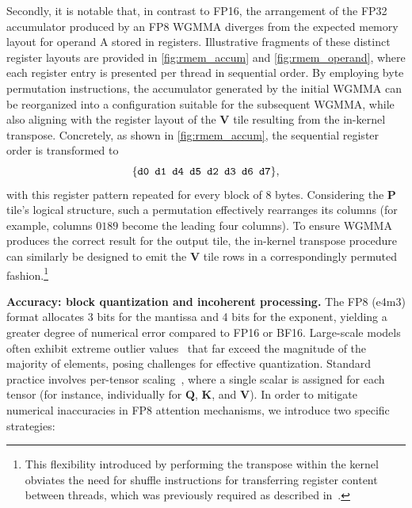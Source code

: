 Secondly, it is notable that, in contrast to FP16, the arrangement of the FP32 accumulator produced by an FP8 WGMMA diverges from the expected memory layout for operand A stored in registers. Illustrative fragments of these distinct register layouts are provided in \cref{fig:rmem_accum} and \cref{fig:rmem_operand}, where each register entry is presented per thread in sequential order. By employing byte permutation instructions, the accumulator generated by the initial WGMMA can be reorganized into a configuration suitable for the subsequent WGMMA, while also aligning with the register layout of the $\mathbf{V}$ tile resulting from the in-kernel transpose. Concretely, as shown in \cref{fig:rmem_accum}, the sequential register order is transformed to
$$\{ \verb|d0 d1 d4 d5 d2 d3 d6 d7| \},$$
with this register pattern repeated for every block of 8 bytes. Considering the $\mathbf{P}$ tile’s logical structure, such a permutation effectively rearranges its columns (for example, columns $0189$ become the leading four columns). To ensure WGMMA produces the correct result for the output tile, the in-kernel transpose procedure can similarly be designed to emit the $\mathbf{V}$ tile rows in a correspondingly permuted fashion.\footnote{This flexibility introduced by performing the transpose within the kernel obviates the need for shuffle instructions for transferring register content between threads, which was previously required as described in~\citep{colfax_fp8_flashattention_2024}.}

\textbf{Accuracy: block quantization and incoherent processing.} The FP8 (e4m3) format allocates 3 bits for the mantissa and 4 bits for the exponent, yielding a greater degree of numerical error compared to FP16 or BF16. Large-scale models often exhibit extreme outlier values~\citep{dettmers2208llm, sun2024massive} that far exceed the magnitude of the majority of elements, posing challenges for effective quantization. Standard practice involves per-tensor scaling~\citep{micikevicius2022fp8}, where a single scalar is assigned for each tensor (for instance, individually for $\mathbf{Q}$, $\mathbf{K}$, and $\mathbf{V}$).
In order to mitigate numerical inaccuracies in FP8 attention mechanisms, we introduce two specific strategies:

